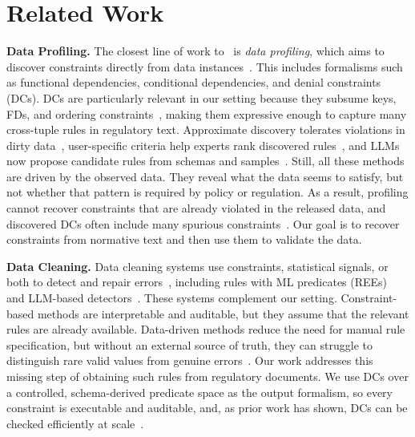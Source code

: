\section{Related Work}
\label{sec:related}

\noindent\textbf{Data Profiling.}
The closest line of work to \system\ is \emph{data profiling}, which aims to discover constraints directly from data instances~\cite{profSurveyFelix2015,Huhtala1998TANE,Fan2009DiscoverCFD,Papenbrock2016HyFD,Bleifuss2017Hydra,chu2013discovering,Pena2022FastDC,icdePena2024}. This includes formalisms such as functional dependencies, conditional dependencies, and denial constraints (DCs). DCs are particularly relevant in our setting because they subsume keys, FDs, and ordering constraints~\cite{chu2013discovering}, making them expressive enough to capture many cross-tuple rules in regulatory text. Approximate discovery tolerates violations in dirty data~\cite{Pena2019DiscoveryDC,martin2026lima}, user-specific criteria help experts rank discovered rules~\cite{fan2023topk}, and LLMs now propose candidate rules from schemas and samples~\cite{biester2024llmclean,glock2026ledqer,li2026lcats}. Still, all these methods are driven by the observed data. They reveal what the data seems to satisfy, but not whether that pattern is required by policy or regulation. As a result, profiling cannot recover constraints that are already violated in the released data, and discovered DCs often include many spurious constraints~\cite{martin2025false}. Our goal is to recover constraints from normative text and then use them to validate the data.


\smallskip
\noindent\textbf{Data Cleaning.}
Data cleaning systems use constraints, statistical signals, or both to detect and repair errors~\cite{dataerrorsZiawash,chu2013holistic,holoclean,raha2019,peng2022garf,cleaningDeploy2024}, including rules with ML predicates (REEs)~\cite{bao2024rock} and LLM-based detectors~\cite{ni2025zeroed,zhang2024cleaning}. These systems complement our setting. Constraint-based methods are interpretable and auditable, but they assume that the relevant rules are already available. Data-driven methods reduce the need for manual rule specification, but without an external source of truth, they can struggle to distinguish rare valid values from genuine errors~\cite{cleaningDeploy2024}. Our work addresses this missing step of obtaining such rules from regulatory documents. We use DCs over a controlled, schema-derived predicate space as the output formalism, so every constraint is executable and auditable, and, as prior work has shown, DCs can be checked efficiently at scale~\cite{facet2021,liu2024rapidash,youri2024}.

